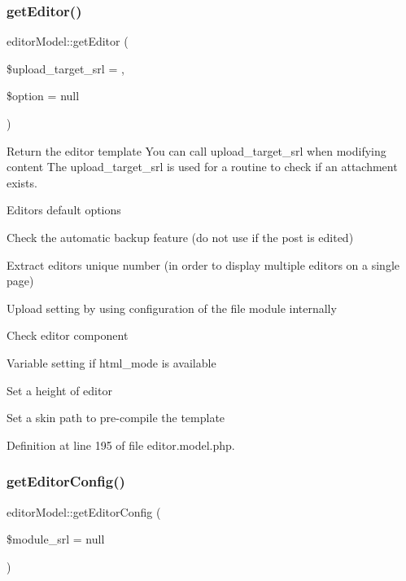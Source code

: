 \subsubsection{\texorpdfstring{get\+Editor()}{getEditor()}}
{\footnotesize\ttfamily editor\+Model\+::get\+Editor (\begin{DoxyParamCaption}\item[{}]{\$upload\+\_\+target\+\_\+srl = {},  }\item[{}]{\$option = {\ttfamily null} }\end{DoxyParamCaption})}



Return the editor template You can call upload\+\_\+target\+\_\+srl when modifying content The upload\+\_\+target\+\_\+srl is used for a routine to check if an attachment exists. 

Editor\textquotesingle{}s default options

Check the automatic backup feature (do not use if the post is edited)

Extract editor\textquotesingle{}s unique number (in order to display multiple editors on a single page)

Upload setting by using configuration of the file module internally

Check editor component

Variable setting if html\+\_\+mode is available

Set a height of editor

Set a skin path to pre-\/compile the template

Definition at line 195 of file editor.\+model.\+php.

\mbox{\label{classeditorModel_a66f732bbdd500d31fb39fd03eb8d46b5}} 
\subsubsection{\texorpdfstring{get\+Editor\+Config()}{getEditorConfig()}}
{\footnotesize\ttfamily editor\+Model\+::get\+Editor\+Config (\begin{DoxyParamCaption}\item[{}]{\$module\+\_\+srl = {\ttfamily null} }\end{DoxyParamCaption})}



